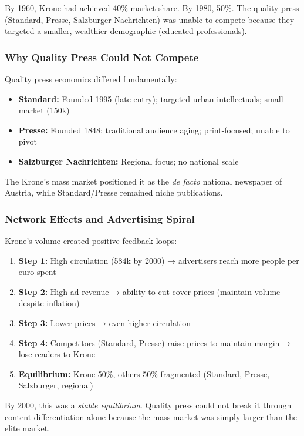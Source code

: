 {By 1960, Krone had achieved 40\% market share. By 1980, 50\%. The quality press (Standard, Presse,
Salzburger Nachrichten) was unable to compete because they targeted a smaller, wealthier demographic
(educated professionals).

\subsubsection*{Why Quality Press Could Not Compete}

Quality press economics differed fundamentally:

\begin{itemize}
\item \textbf{Standard:} Founded 1995 (late entry); targeted urban intellectuals; small market (150k)
\item \textbf{Presse:} Founded 1848; traditional audience aging; print-focused; unable to pivot
\item \textbf{Salzburger Nachrichten:} Regional focus; no national scale
\end{itemize}

The Krone's mass market positioned it as the \textit{de facto} national newspaper of Austria, while
Standard/Presse remained niche publications.

\subsubsection*{Network Effects and Advertising Spiral}

Krone's volume created positive feedback loops:

\begin{enumerate}
\item \textbf{Step 1:} High circulation (584k by 2000) → advertisers reach more people per euro spent
\item \textbf{Step 2:} High ad revenue → ability to cut cover prices (maintain volume despite inflation)
\item \textbf{Step 3:} Lower prices → even higher circulation
\item \textbf{Step 4:} Competitors (Standard, Presse) raise prices to maintain margin → lose readers to Krone
\item \textbf{Equilibrium:} Krone 50\%, others 50\% fragmented (Standard, Presse, Salzburger, regional)
\end{enumerate}

By 2000, this was a \textit{stable equilibrium}. Quality press could not break it through content
differentiation alone because the mass market was simply larger than the elite market.

}
